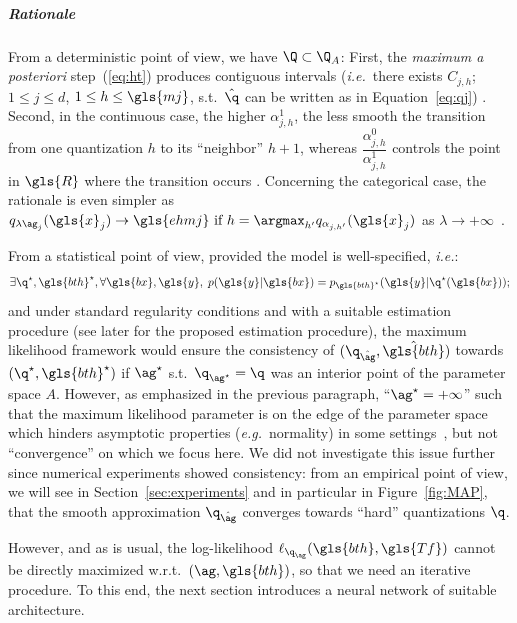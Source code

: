 \subparagraph{Rationale}

From a deterministic point of view, we have $\Q \subset \Q_A$: First, the \textit{maximum a posteriori} step~(\ref{eq:ht}) produces contiguous intervals (\textit{i.e.}\ there exists $C_{j,h}$; $1 \leq j \leq d$, $1 \leq h \leq \gls{mj}$, s.t.\ ${\hat{\q}}$ can be written as in Equation~\eqref{eq:qj}) \cite{same2011model}. Second, in the continuous case, the higher $\alpha_{j,h}^1$, the less smooth the transition from one quantization $h$ to its ``neighbor''{\footnotemark[1]{}} $h+1$, whereas $\dfrac{\alpha_{j,h}^0}{\alpha_{j,h}^1}$ controls the point in $\gls{R}$ where the transition occurs \cite{chamroukhi2009regression}. Concerning the categorical case, the rationale is even simpler as $q_{\lambda \ag_j}(\gls{x}_j) \to \gls{ehmj} \text{ if } h = \argmax_{h'} q_{\alpha_{j,h'}}(\gls{x}_j)$ as $\lambda \to +\infty$~\cite{reverdy2016parameter}.

From a statistical point of view, 
provided the model is well-specified, \textit{i.e.}:
\begin{equation} \label{eq:well_quant}
\exists \q^\star, \gls{bth}^\star, \forall \gls{bx},\gls{y}, \; p(\gls{y} | \gls{bx}) = p_{\gls{bth}^\star}(\gls{y} | \q^\star(\gls{bx}));
\end{equation}
and under standard regularity conditions and with a suitable estimation procedure (see later for the proposed estimation procedure), the maximum likelihood framework would ensure the consistency of $(\q_{\hat{\ag}}, \hat{\gls{bth}})$ towards $(\q^\star,\gls{bth}^\star)$ if $\ag^\star$ s.t.\ $\q_{\ag^\star} = \q$ was an interior point of the parameter space $A$. However, as emphasized in the previous paragraph, ``$\ag^\star = + \infty$'' such that the maximum likelihood parameter is on the edge of the parameter space which hinders asymptotic properties (\textit{e.g.}\ normality) in some settings~\cite{10.2307/2289471}, but not ``convergence'' on which we focus here. We did not investigate this issue further since numerical experiments showed consistency: from an empirical point of view, we will see in Section~\ref{sec:experiments} and in particular in Figure~\ref{fig:MAP}, that the smooth approximation $\q_{\hat{\ag}}$ converges towards ``hard'' quantizations{\footnotemark[1]{}} $\q$.

However, and as is usual, the log-likelihood $\ell_{\q_{\ag}}(\gls{bth},\gls{Tf})$ cannot be directly maximized w.r.t.\ $(\ag,\gls{bth})$, so that we need an iterative procedure. To this end, the next section introduces a neural network of suitable architecture.

